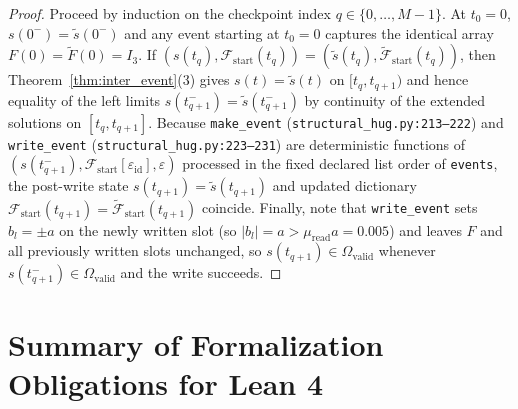 \documentclass[11pt,a4paper]{article}
\theoremstyle{definition}
\begin{document}
\begin{proof}
Proceed by induction on the checkpoint index $q \in \{0, \dots, M-1\}$. At $t_0 = 0$, $s(0^-) = \widetilde{s}(0^-)$ and any event starting at $t_0 = 0$ captures the identical array $F(0) = \widetilde{F}(0) = I_3$. If $(s(t_q), \mathcal{F}_{\mathrm{start}}(t_q)) = (\widetilde{s}(t_q), \widetilde{\mathcal{F}}_{\mathrm{start}}(t_q))$, then Theorem~\ref{thm:inter_event}(3) gives $s(t) = \widetilde{s}(t)$ on $[t_q, t_{q+1})$ and hence equality of the left limits $s(t_{q+1}^-) = \widetilde{s}(t_{q+1}^-)$ by continuity of the extended solutions on $[t_q, t_{q+1}]$. Because \texttt{make\_event} (\texttt{structural\_hug.py:213--222}) and \texttt{write\_event} (\texttt{structural\_hug.py:223--231}) are deterministic functions of $(s(t_{q+1}^-), \mathcal{F}_{\mathrm{start}}[\varepsilon_{\mathrm{id}}], \varepsilon)$ processed in the fixed declared list order of \texttt{events}, the post-write state $s(t_{q+1}) = \widetilde{s}(t_{q+1})$ and updated dictionary $\mathcal{F}_{\mathrm{start}}(t_{q+1}) = \widetilde{\mathcal{F}}_{\mathrm{start}}(t_{q+1})$ coincide. Finally, note that \texttt{write\_event} sets $b_l = \pm a$ on the newly written slot (so $|b_l| = a > \mu_{\mathrm{read}}a = 0.005$) and leaves $F$ and all previously written slots unchanged, so $s(t_{q+1}) \in \Omega_{\mathrm{valid}}$ whenever $s(t_{q+1}^-) \in \Omega_{\mathrm{valid}}$ and the write succeeds.
\end{proof}

\section{Summary of Formalization Obligations for Lean 4}
\end{document}
